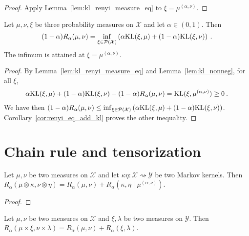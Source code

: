 \begin{proof}
Apply Lemma~\ref{lem:kl_renyi_measure_eq} to $\xi = \mu^{(\alpha, \nu)}$.
\end{proof}

\begin{lemma}
  \label{lem:renyi_eq_inf_add_kl}
  Let $\mu, \nu, \xi$ be three probability measures on $\mathcal X$ and let $\alpha \in (0, 1)$. Then
  \begin{align*}
  (1 - \alpha) R_\alpha(\mu, \nu) = \inf_{\xi \in \mathcal P(\mathcal X)}\left( \alpha \mathrm{KL}(\xi, \mu) + (1 - \alpha)\mathrm{KL}(\xi, \nu) \right) \: .
  \end{align*}
  The infimum is attained at $\xi = \mu^{(\alpha, \nu)}$.
\end{lemma}

\begin{proof}
By Lemma~\ref{lem:kl_renyi_measure_eq} and Lemma~\ref{lem:kl_nonneg}, for all $\xi$,
\begin{align*}
\alpha \mathrm{KL}(\xi, \mu) + (1 - \alpha)\mathrm{KL}(\xi, \nu) - (1 - \alpha) R_\alpha(\mu, \nu)
= \mathrm{KL}(\xi, \mu^{(\alpha, \nu)})
\ge 0 \: .
\end{align*}
We have then $(1 - \alpha) R_\alpha(\mu, \nu) \le \inf_{\xi \in \mathcal P(\mathcal X)}\left( \alpha \mathrm{KL}(\xi, \mu) + (1 - \alpha)\mathrm{KL}(\xi, \nu) \right)$.
Corollary~\ref{cor:renyi_eq_add_kl} proves the other inequality.
\end{proof}

\section{Chain rule and tensorization}

\begin{theorem}
  \label{thm:renyi_chain_rule}
  Let $\mu, \nu$ be two measures on $\mathcal X$ and let $\kappa \eta : \mathcal X \rightsquigarrow \mathcal Y$ be two Markov kernels.
  Then $R_\alpha(\mu \otimes \kappa, \nu \otimes \eta) = R_\alpha(\mu, \nu) + R_\alpha(\kappa, \eta \mid \mu^{(\alpha, \nu)})$.
\end{theorem}

\begin{proof}
\end{proof}

\begin{corollary}
  \label{cor:renyi_prod_two}
  Let $\mu, \nu$ be two measures on $\mathcal X$ and $\xi, \lambda$ be two measures on $\mathcal Y$.
  Then $R_\alpha(\mu \times \xi, \nu \times \lambda) = R_\alpha(\mu, \nu) + R_\alpha(\xi, \lambda)$.
\end{corollary}

